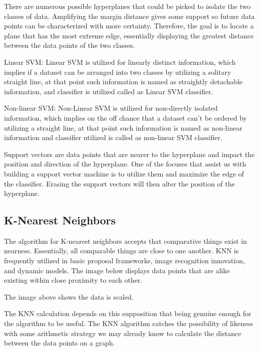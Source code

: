 \documentclass[a4paper,12pt]{report}
\begin{document}

There are numerous possible hyperplanes that could be picked to isolate the two classes of data. Amplifying the margin distance gives some support so future data points can be characterized with more certainty. Therefore, the goal is to locate a plane that has the most extreme edge, essentially displaying the greatest distance between the data points of the two classes.


Linear SVM: Linear SVM is utilized for linearly distinct information, which implies if a dataset can be arranged into two classes by utilizing a solitary straight line, at that point such information is named as straightly detachable information, and classifier is utilized called as Linear SVM classifier.


Non-linear SVM: Non-Linear SVM is utilized for non-directly isolated information, which implies on the off chance that a dataset can't be ordered by utilizing a straight line, at that point such information is named as non-linear information and classifier utilized is called as non-linear SVM classifier.


Support vectors are data points that are nearer to the hyperplane and impact the position and direction of the hyperplane. One of the focuses that assist us with building a support vector machine is to utilize them and maximize the edge of the classifier. Erasing the support vectors will then alter the position of the hyperplane.

\subsection{K-Nearest Neighbors}
 
The algorithm for K-nearest neighbors accepts that comparative things exist in nearness. Essentially, all comparable things are close to one another. KNN is frequently utilized in basic proposal frameworks, image recognition innovation, and dynamic models. The image below displays data points that are alike existing within close proximity to each other.


The image above shows the data is scaled.


The KNN calculation depends on this supposition that being genuine enough for the algorithm to be useful. The KNN algorithm catches the possibility of likeness with some arithmetic strategy we may already know to calculate the distance between the data points on a graph.
\end{document}
